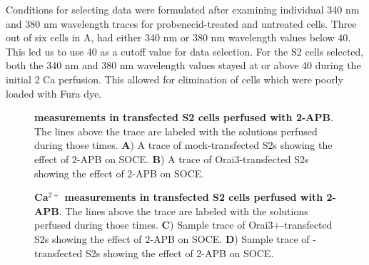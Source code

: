 Conditions for selecting data were formulated after examining individual 340 nm and 380 nm wavelength traces for probenecid-treated and untreated cells. Three out of six cells in A, had either 340 nm or 380 nm wavelength values below 40. This led us to use 40 as a cutoff value for data selection. For the S2 cells selected, both the 340 nm and 380 nm wavelength values stayed at or above 40 during the initial 2 Ca perfusion. This allowed for elimination of cells which were poorly loaded with Fura dye.

\newpage

\begin{figure}[!ht]
	\centering
	
	\subfloat{
		\begin{lpic}[clean]{Figures/s2_ca_orai3_all5(0.45)}
			\lbl[bl]{5,210; \bfseries B}
		\end{lpic}
	} 
	\caption[\Ca{} measurements in transfected S2 cells perfused with 2-APB]{{\bfseries \Ca{} measurements in transfected S2 cells perfused with 2-APB}. 	
	The lines above the trace are labeled with the solutions perfused during those times. \textbf{A}) A trace of mock-transfected S2s showing the effect of 2-APB on SOCE. \textbf{B}) A trace of Orai3-transfected S2s showing the effect of 2-APB on SOCE.}
	\label{fig:s2_composite}
\end{figure}
	
\begin{figure}[!ht]
	\centering
	\ContinuedFloat
	
	\caption[]{{\bfseries Ca$^{2+}$ measurements in transfected S2 cells perfused with 2-APB}. 	
	The lines above the trace are labeled with the solutions perfused during those times. \textbf{C}) Sample trace of Orai3+\stim{}-transfected S2s showing the effect of 2-APB on SOCE. \textbf{D}) Sample trace of \stim{}-transfected S2s showing the effect of 2-APB on SOCE.}
	\label{fig:s2_composite}
\end{figure}


